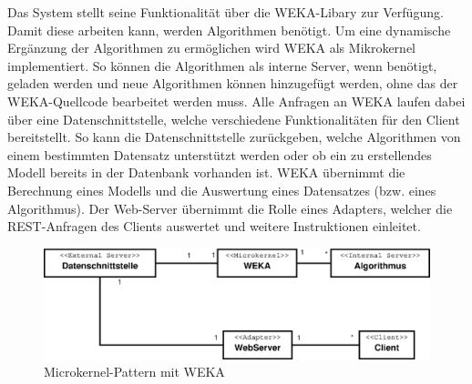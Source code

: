 Das System stellt seine Funktionalität über die WEKA-Libary zur Verfügung. Damit diese arbeiten kann, werden Algorithmen benötigt. 
Um eine dynamische Ergänzung der Algorithmen zu ermöglichen wird WEKA als Mikrokernel implementiert. 
So können die Algorithmen als interne Server, wenn benötigt, geladen werden und neue Algorithmen können hinzugefügt werden, ohne das der WEKA-Quellcode bearbeitet werden muss. 
Alle Anfragen an WEKA laufen dabei über eine Datenschnittstelle, welche verschiedene Funktionalitäten für den Client bereitstellt.
So kann die Datenschnittstelle zurückgeben, welche Algorithmen von einem bestimmten Datensatz unterstützt werden oder ob ein zu erstellendes Modell bereits in der Datenbank vorhanden ist. 
WEKA übernimmt die Berechnung eines Modells und die Auswertung eines Datensatzes (bzw. eines Algorithmus). 
Der Web-Server übernimmt die Rolle eines Adapters, welcher die REST-Anfragen des Clients auswertet und weitere Instruktionen einleitet.\\
\begin{figure}[h]
\centering
\includegraphics[width=0.9\linewidth]{Grafik/Diagramm/Microkernel}
\caption[Microkernel-Klassen]{Microkernel-Pattern mit WEKA}
\label{fig:Microkernel}
\end{figure}